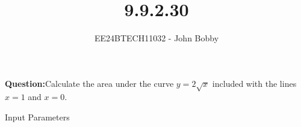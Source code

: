 \documentclass[journal]{IEEEtran}
\begin{document}

\vspace{3cm}
\title{9.9.2.30}
\author{EE24BTECH11032 - John Bobby}
{\let\newpage\relax\maketitle}

\renewcommand{\thefigure}{\theenumi}
\renewcommand{\thetable}{\theenumi}
\setlength{\intextsep}{10pt} %


\renewcommand{\thetable}{\theenumi}


\textbf{Question:}Calculate the area under the curve $y=2\sqrt{x}$ included with the lines $x=1$ and $x=0$.\\
\begin{table}[h!]    
  \centering
  
  \caption{Input Parameters}
  \label{tab9.9.2.30}
\end{table}
\end{document}
